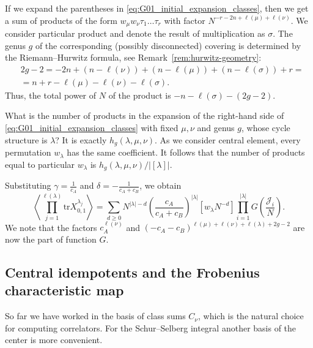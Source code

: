 \documentclass{article}
\newcommand{\tr}{\mathrm{tr}}
\theoremstyle{plain}
\theoremstyle{definition}
\numberwithin{equation}{section}
\begin{document}
If we expand the parentheses in \eqref{eq:G01_initial_expansion_classes}, then we get a sum of products of the form $w_\mu w_\nu \tau_1 \dots \tau_r$ with factor $N^{-r-2n+\ell(\mu)+\ell(\nu)}$. We consider particular product and denote the result of multiplication as $\sigma$. The genus $g$ of the corresponding (possibly disconnected) covering is determined by the
Riemann--Hurwitz formula, see Remark~\ref{rem:hurwitz-geometry}:
\begin{equation}
    \label{eq:RH_GGR_case}
    \begin{aligned}
        & 2g-2 = -2n+(n-\ell(\nu))+(n-\ell(\mu))+(n-\ell(\sigma))+r = \\
        & = n+r-\ell(\mu)-\ell(\nu)-\ell(\sigma).
    \end{aligned}
\end{equation}
Thus, the total power of $N$ of the product is $-n - \ell(\sigma)-(2g-2)$.

What is the number of products in the expansion of the right-hand side of \eqref{eq:G01_initial_expansion_classes} with fixed $\mu,\nu$ and genus $g$, whose cycle structure is $\lambda$? It is exactly $h_g(\lambda, \mu, \nu)$. As we consider central element, every permutation $w_\lambda$ has the same coefficient. It follows that the number of products equal to particular $w_\lambda$ is $h_g(\lambda, \mu, \nu)/|[\lambda]|$.

Substituting $\gamma=\frac{1}{c_A}$ and $\delta=-\frac{1}{c_A+c_B}$, we obtain
\begin{equation}
    \label{eq:01cor_G_function}
    \left<\prod_{j=1}^{\ell(\lambda)}\tr X^{\lambda_{j}}_{0,1}\right> = \sum\limits_{d\ge 0} N^{|\lambda|-d} \left(\frac{c_{A}}{c_{A}+c_{B}}\right)^{|\lambda|} [w_{\lambda} N^{-d}] \prod_{i=1}^{|\lambda|} G\left(\frac{\mathcal{J}_{i}}{N} \right).
\end{equation}
We note that the factors $c_{A}^{\ell(\nu)}$ and $(-c_{A}-c_{B})^{\ell(\mu)+\ell(\nu)+\ell(\lambda)+2g-2}$ are now the part of function $G$.

\subsection{Central idempotents and the Frobenius characteristic map}
\label{subs:idemp}

So far we have worked in the basis of class sums $C_\nu$, which is the natural
choice for computing correlators. For the Schur--Selberg integral another
basis of the center is more convenient.
\end{document}
